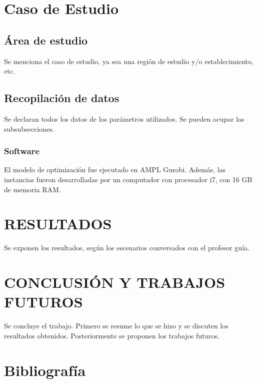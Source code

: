 \documentclass[letterpaper,conference]{IEEEtran}
\begin{document}


\section{Caso de Estudio}

\subsection{Área de estudio}

Se menciona el caso de estudio, ya sea una región de estudio y/o establecimiento, etc.

\subsection{Recopilación de datos}

Se declaran todos los datos de los parámetros utilizados. Se pueden ocupar las subsubsecciones.

\subsubsection{Software}

El modelo de optimización fue ejecutado en AMPL Gurobi. Además, las instancias fueron desarrolladas por un computador con procesador i7, con 16 GB de memoria RAM.

\section{RESULTADOS}

Se exponen los resultados, según los escenarios conversados con el profesor guía.

\section{CONCLUSIÓN Y TRABAJOS FUTUROS}

Se concluye el trabajo. Primero se resume lo que se hizo y se discuten los resultados obtenidos. Posteriormente se proponen los trabajos futuros.
\newpage
\section{Bibliografía}

\printbibliography
\end{document}
